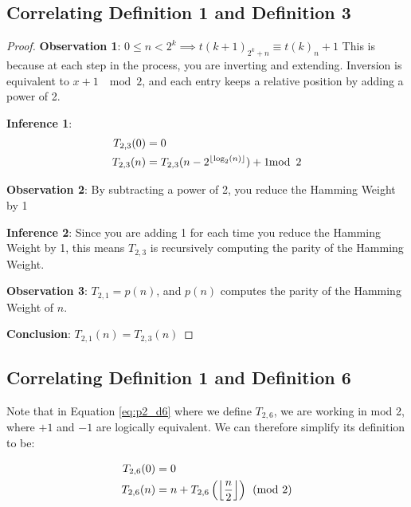 \documentclass[conference]{IEEEtran}
\begin{document}
\subsection{Correlating Definition 1 and Definition 3}

\begin{proof}
\par\noindent\par
    \textbf{Observation 1}: $0 \le n < 2^k \implies t(k+1)_{2^k + n} \equiv t(k)_n + 1$
    This is because at each step in the process, you are inverting and extending. Inversion is equivalent to $x + 1 \; \mod{2}$, and each entry keeps a relative position by adding a power of 2.

    \textbf{Inference 1}: \begin{equation}
        \begin{aligned}
            T_{2,3}(0) &= 0 \\
            T_{2,3}(n) &= T_{2,3}(n - 2^{\floor{\log_2(n)}}) + 1 \mod{2}
        \end{aligned}
    \end{equation}

    \textbf{Observation 2}: By subtracting a power of 2, you reduce the Hamming Weight by 1

    \textbf{Inference 2}: Since you are adding 1 for each time you reduce the Hamming Weight by 1, this means $T_{2,3}$ is recursively computing the parity of the Hamming Weight.

    \textbf{Observation 3}: $T_{2,1} = p(n)$, and $p(n)$ computes the parity of the Hamming Weight of $n$.

    \textbf{Conclusion}: $T_{2,1}(n) = T_{2,3}(n)$
\end{proof}

\subsection{Correlating Definition 1 and Definition 6}

Note that in Equation \ref{eq:p2_d6} where we define $T_{2,6}$, we are working in mod 2, where $+1$ and $-1$ are logically equivalent. We can therefore simplify its definition to be:

\begin{equation}
    \label{eq:p2d06s}
    \begin{aligned}
T_{2,6}(0) &= 0 \\
T_{2,6}(n) &= n + T_{2,6}\left(\floor{\dfrac{n}{2}}\right) \pmod{2}
    \end{aligned}
\end{equation}
\end{document}
